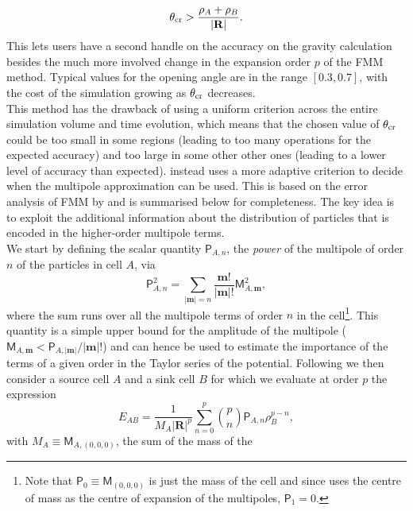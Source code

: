 \begin{equation}
  \theta_{\rm cr} > \frac{\rho_A + \rho_B} {|\mathbf{R}|}.
  \label{eq:fmm:angle}
\end{equation}
This lets users have a second handle on the accuracy on the gravity
calculation besides the much more involved change in the expansion order
$p$ of the FMM method. Typical values for the opening angle are in the
range $[0.3, 0.7]$, with the cost of the simulation growing as $\theta_{\rm
  cr}$ decreases. \\
This method has the drawback of using a uniform criterion across the entire
simulation volume and time evolution, which means that the chosen value of
$\theta_{\rm cr}$ could be too small in some regions (leading to too many
operations for the expected accuracy) and too large in some other other
ones (leading to a lower level of accuracy than expected). \swift instead
uses a more adaptive criterion to decide when the multipole approximation
can be used. This is based on the error analysis of FMM by
\cite{Dehnen2014} and is summarised below for completeness. The key idea is
to exploit the additional information about the distribution of particles
that is encoded in the higher-order multipole terms.\\
We start by defining the scalar quantity $\mathsf{P}_{A,n}$, the
\emph{power} of the multipole of order $n$ of the particles in cell $A$,
via
\begin{equation}
  \mathsf{P}_{A,n}^2 = \sum_{|\mathbf{m}|=n} \frac{\mathbf{m}!}{|\mathbf{m}|!}\mathsf{M}_{A,\mathbf{m}}^2,
\end{equation}
where the sum runs over all the multipole terms of order $n$ in the
cell\footnote{Note that $\mathsf{P}_{0} \equiv \mathsf{M}_{(0,0,0)}$ is
  just the mass of the cell and since \swift uses the centre of mass as the
  centre of expansion of the multipoles, $\mathsf{P}_{1} = 0$.}. This
quantity is a simple upper bound for the amplitude of the multipole
($\mathsf{M}_{A, \mathbf{m}} < \mathsf{P}_{A,|\mathbf{m}|}/|\mathbf{m}|!$)
and can hence be used to estimate the importance of the terms of a given
order in the Taylor series of the potential. Following \cite{Dehnen2014} we
then consider a source cell $A$ and a sink cell $B$ for which we evaluate
at order $p$ the expression
\begin{equation}
  E_{AB} = \frac{1}{M_A|\mathbf{R}|^p} \sum_{n=0}^p \binom{p}{n} \mathsf{P}_{A,n}
  \rho_B^{p-n},
  \label{eq:fmm:e_ab}
\end{equation}
with $M_A \equiv \mathsf{M}_{A,(0,0,0)}$, the sum of the mass of the
